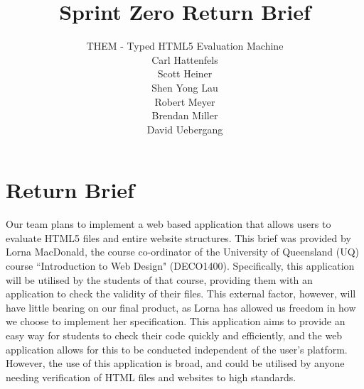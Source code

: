 \documentclass[12pt]{article}
\title{\bf Sprint Zero Return Brief}
\author{THEM - Typed HTML5 Evaluation Machine \\ Carl Hattenfels \\ Scott Heiner \\ Shen Yong Lau \\ Robert Meyer \\ Brendan Miller \\ David Uebergang}
\begin{document}
\maketitle

\section*{Return Brief}

Our team plans to implement a web based application that allows users to evaluate HTML5 files and entire website structures. This brief was provided by Lorna MacDonald, the course co-ordinator of the University of Queensland (UQ) course ``Introduction to Web Design" (DECO1400). Specifically, this application will be utilised by the students of that course, providing them with an application to check the validity of their files. This external factor, however, will have little bearing on our final product, as Lorna has allowed us freedom in how we choose to implement her specification. This application aims to provide an easy way for students to check their code quickly and efficiently, and the web application allows for this to be conducted independent of the user's platform. However, the use of this application is broad, and could be utilised by anyone needing verification of HTML files and websites to high standards.
\end{document}
